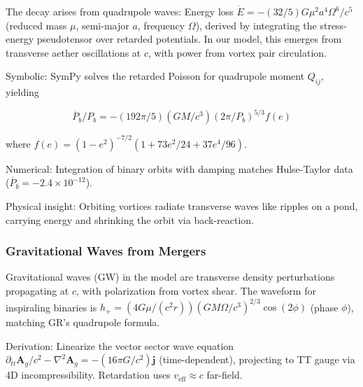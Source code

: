 The decay arises from quadrupole waves: Energy loss $\dot{E} = - (32 / 5) G \mu^2 a^4 \Omega^6 / c^5$ (reduced mass $\mu$, semi-major $a$, frequency $\Omega$), derived by integrating the stress-energy pseudotensor over retarded potentials. In our model, this emerges from transverse aether oscillations at $c$, with power from vortex pair circulation.

Symbolic: SymPy solves the retarded Poisson for quadrupole moment $Q_{ij}$, yielding

\[
\dot{P_b} / P_b = - (192\pi / 5) (G M / c^3) (2\pi / P_b)^{5/3} f(e)
\]

where $f(e) = (1 - e^2)^{-7/2} (1 + 73 e^2 / 24 + 37 e^4 / 96)$.

Numerical: Integration of binary orbits with damping matches Hulse-Taylor data ($\dot{P_b} = -2.4 \times 10^{-12}$).

Physical insight: Orbiting vortices radiate transverse waves like ripples on a pond, carrying energy and shrinking the orbit via back-reaction.

\medskip
\noindent
{}
\medskip

\subsubsection{Gravitational Waves from Mergers}

Gravitational waves (GW) in the model are transverse density perturbations propagating at $c$, with polarization from vortex shear. The waveform for inspiraling binaries is $h_+ = (4 G \mu / (c^2 r)) (G M \Omega / c^3)^{2/3} \cos(2 \phi)$ (phase $\phi$), matching GR's quadrupole formula.

Derivation: Linearize the vector sector wave equation $\partial_{tt} \mathbf{A}_g / c^2 - \nabla^2 \mathbf{A}_g = - (16\pi G / c^2) \mathbf{j}$ (time-dependent), projecting to TT gauge via 4D incompressibility. Retardation uses $v_{\text{eff}} \approx c$ far-field.

